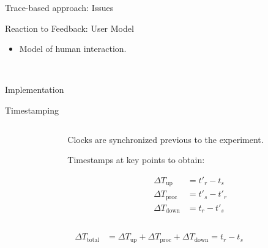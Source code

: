 \documentclass[aspectratio=1610]{beamer}
\begin{document}
\begin{frame}{Trace-based approach: Issues}
\end{frame}

\begin{frame}{Reaction to Feedback: User Model}
    \begin{itemize}
        \item Model of human interaction.
    \end{itemize}
    \begin{center}
        \\
        \vspace{.1\textheight}%
    \end{center}
\end{frame}

\begin{ssframe}{Implementation}
    \begin{center}
        
    \end{center}
\end{ssframe}

\begin{frame}{Timestamping}
    \begin{columns}[onlytextwidth]
        \begin{column}{.5\linewidth}
            \footnotesize%
            \raggedright%
            
        \end{column}%
        \begin{column}{.5\linewidth}
            Clocks are synchronized previous to the experiment.

            \vspace{\baselineskip}%
            Timestamps at key points to obtain:

            \begin{align}
                {\Delta}T_\text{up} &= t'_{r} - t_{s}\\
                {\Delta}T_\text{proc} &= t'_{s} - t'_{r}\\
                {\Delta}T_\text{down} &= t_{r} - t'_{s}
            \end{align}
        \end{column}%
    \end{columns}
    \begin{align}
        {\Delta}T_\text{total} &= {\Delta}T_\text{up} + {\Delta}T_\text{proc} + {\Delta}T_\text{down} = t_{r} - t_{s}
    \end{align}
\end{frame}
\end{document}
